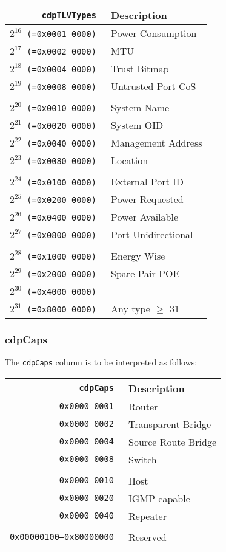 \documentclass[documentation]{subfiles}
\begin{document}
\begin{minipage}{.48\textwidth}
    \begin{longtable}{>{\tt}rl}
        \toprule
        {\bf cdpTLVTypes} & {\bf Description}\\
        \midrule\endhead%
        $2^{16}$ (=0x0001 0000) & Power Consumption\\
        $2^{17}$ (=0x0002 0000) & MTU\\
        $2^{18}$ (=0x0004 0000) & Trust Bitmap\\
        $2^{19}$ (=0x0008 0000) & Untrusted Port CoS\\
        \\
        $2^{20}$ (=0x0010 0000) & System Name\\
        $2^{21}$ (=0x0020 0000) & System OID\\
        $2^{22}$ (=0x0040 0000) & Management Address\\
        $2^{23}$ (=0x0080 0000) & Location\\
        \\
        $2^{24}$ (=0x0100 0000) & External Port ID\\
        $2^{25}$ (=0x0200 0000) & Power Requested\\
        $2^{26}$ (=0x0400 0000) & Power Available\\
        $2^{27}$ (=0x0800 0000) & Port Unidirectional\\
        \\
        $2^{28}$ (=0x1000 0000) & Energy Wise\\
        $2^{29}$ (=0x2000 0000) & Spare Pair POE\\
        $2^{30}$ (=0x4000 0000) & ---\\
        $2^{31}$ (=0x8000 0000) & Any type $\geq$ 31\\
        \bottomrule
    \end{longtable}
\end{minipage}

\clearpage

\subsubsection{cdpCaps}\label{cdpCaps}
The {\tt cdpCaps} column is to be interpreted as follows:
\begin{longtable}{>{\tt}rl}
    \toprule
    {\bf cdpCaps} & {\bf Description}\\
    \midrule\endhead%
    0x0000 0001 & Router\\
    0x0000 0002 & Transparent Bridge\\
    0x0000 0004 & Source Route Bridge\\
    0x0000 0008 & Switch\\
    \\
    0x0000 0010 & Host\\
    0x0000 0020 & IGMP capable\\
    0x0000 0040 & Repeater\\
    \\
    0x00000100--0x80000000 & Reserved\\
    \bottomrule
\end{longtable}
\end{document}
